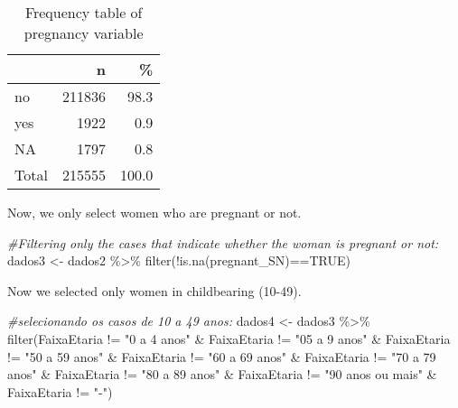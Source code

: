 \documentclass[
]{article}
\newenvironment{Shaded}{\begin{snugshade}}{\end{snugshade}}
\newcommand{\CommentTok}[1]{\textcolor[rgb]{0.56,0.35,0.01}{\textit{#1}}}
\newcommand{\ConstantTok}[1]{\textcolor[rgb]{0.00,0.00,0.00}{#1}}
\newcommand{\FunctionTok}[1]{\textcolor[rgb]{0.00,0.00,0.00}{#1}}
\newcommand{\NormalTok}[1]{#1}
\newcommand{\OtherTok}[1]{\textcolor[rgb]{0.56,0.35,0.01}{#1}}
\newcommand{\SpecialCharTok}[1]{\textcolor[rgb]{0.00,0.00,0.00}{#1}}
\newcommand{\StringTok}[1]{\textcolor[rgb]{0.31,0.60,0.02}{#1}}
\begin{document}
\begin{table}[H]

\caption{\label{tab:unnamed-chunk-12}Frequency table of pregnancy variable}
\centering
\begin{tabular}[t]{l|r|r}
\hline
  & n & \%\\
\hline
no & 211836 & 98.3\\
\hline
yes & 1922 & 0.9\\
\hline
NA & 1797 & 0.8\\
\hline
Total & 215555 & 100.0\\
\hline
\end{tabular}
\end{table}

Now, we only select women who are pregnant or not.

\begin{Shaded}
\begin{Highlighting}[]
\CommentTok{\#Filtering only the cases that indicate whether the woman is pregnant or not:}
\NormalTok{dados3 }\OtherTok{\textless{}{-}}\NormalTok{ dados2 }\SpecialCharTok{\%\textgreater{}\%} 
  \FunctionTok{filter}\NormalTok{(}\SpecialCharTok{!}\FunctionTok{is.na}\NormalTok{(pregnant\_SN)}\SpecialCharTok{==}\ConstantTok{TRUE}\NormalTok{)}
\end{Highlighting}
\end{Shaded}

Now we selected only women in childbearing (10-49).

\begin{Shaded}
\begin{Highlighting}[]
\CommentTok{\#selecionando os casos de 10 a 49 anos:}
\NormalTok{dados4 }\OtherTok{\textless{}{-}}\NormalTok{ dados3 }\SpecialCharTok{\%\textgreater{}\%} 
  \FunctionTok{filter}\NormalTok{(FaixaEtaria }\SpecialCharTok{!=} \StringTok{"0 a 4 anos"} \SpecialCharTok{\&} 
\NormalTok{           FaixaEtaria }\SpecialCharTok{!=} \StringTok{"05 a 9 anos"} \SpecialCharTok{\&}
\NormalTok{           FaixaEtaria }\SpecialCharTok{!=} \StringTok{"50 a 59 anos"} \SpecialCharTok{\&}
\NormalTok{           FaixaEtaria }\SpecialCharTok{!=} \StringTok{"60 a 69 anos"} \SpecialCharTok{\&}
\NormalTok{           FaixaEtaria }\SpecialCharTok{!=} \StringTok{"70 a 79 anos"} \SpecialCharTok{\&}
\NormalTok{           FaixaEtaria }\SpecialCharTok{!=} \StringTok{"80 a 89 anos"} \SpecialCharTok{\&}
\NormalTok{           FaixaEtaria }\SpecialCharTok{!=} \StringTok{"90 anos ou mais"} \SpecialCharTok{\&} 
\NormalTok{           FaixaEtaria }\SpecialCharTok{!=}    \StringTok{"{-}"}\NormalTok{)}
\end{Highlighting}
\end{Shaded}
\end{document}
